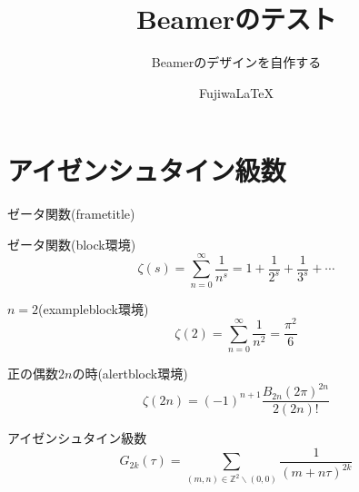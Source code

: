 \documentclass[dvipdfmx]{beamer}
\title{Beamerのテスト}
\subtitle{Beamerのデザインを自作する}
\author{FujiwaLaTeX}
\institute{室蘭工業大学大学院工学研究科 情報電子工学系専攻}
\begin{document}
\maketitle
\section{アイゼンシュタイン級数}
\begin{frame}{ゼータ関数(frametitle)}
  \begin{block}{ゼータ関数(block環境)}\alert{
    \begin{equation*}
      \zeta(s) = \sum_{n=0}^{\infty} \frac{1}{n^s} = 1 + \frac{1}{2^s} + \frac{1}{3^s} + \cdots
    \end{equation*}}
  \end{block}
  \begin{exampleblock}{$n = 2$(exampleblock環境)}
    \begin{equation*}
      \zeta(2) = \sum_{n=0}^{\infty} \frac{1}{n^2} = \frac{\pi^2}{6}
    \end{equation*}
  \end{exampleblock}
  \begin{alertblock}{正の偶数$2n$の時(alertblock環境)}
    \begin{equation*}
      \zeta(2n) = (-1)^{n+1} \frac{B_{2n}(2\pi)^{2n}}{2(2n)!}
    \end{equation*}
  \end{alertblock}
\end{frame}

\begin{frame}{アイゼンシュタイン級数}
  \begin{equation*}
    G_{2k}(\tau) = \sum_{(m,n) \in \mathbb{Z}^2 \backslash (0,0)}\frac{1}{(m+n\tau)^{2k}}
  \end{equation*}
\end{frame}
\end{document}
